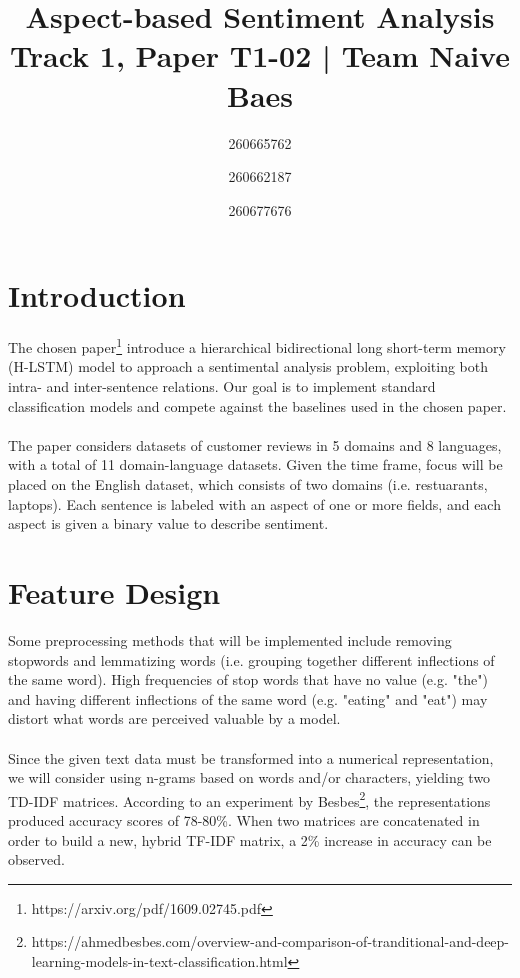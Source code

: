 \documentclass[comsoc,conference]{IEEEtran}
\begin{document}
\title{Aspect-based Sentiment Analysis
	\\ \large{Track 1, Paper T1-02 | Team Naive Baes}
}

\author{
	260665762 \\
	\and
	260662187 \\
	\and
	260677676 \\
}

\maketitle

\section{Introduction} 
\vspace{5px} \noindent 
The chosen paper\footnote{\label{} https://arxiv.org/pdf/1609.02745.pdf} introduce a hierarchical bidirectional long short-term memory (H-LSTM) model to approach a sentimental analysis problem, exploiting both intra- and inter-sentence relations. Our goal is to implement standard classification models and compete against the baselines used in the chosen paper. 
\\
\\ The paper considers datasets of customer reviews in 5 domains and 8 languages, with a total of 11 domain-language datasets. Given the time frame, focus will be placed on the English dataset, which consists of two domains (i.e. restuarants, laptops). Each sentence is labeled with an aspect of one or more fields, and each aspect is given a binary value to describe sentiment.

\section{Feature Design} 
\vspace{5px} \noindent 
Some preprocessing methods that will be implemented include removing stopwords and lemmatizing words (i.e. grouping together different inflections of the same word). High frequencies of stop words that have no value (e.g. "the") and having different inflections of the same word (e.g. "eating" and "eat") may distort what words are perceived valuable by a model.
\\
\\ Since the given text data must be transformed into a numerical representation, we will consider using n-grams based on words and/or characters, yielding two TD-IDF matrices. According to an experiment by Besbes\footnote{\label{} https://ahmedbesbes.com/overview-and-comparison-of-tranditional-and-deep-learning-models-in-text-classification.html}, the representations produced accuracy scores of 78-80\%. When two matrices are concatenated in order to build a new, hybrid TF-IDF matrix, a 2\% increase in accuracy can be observed. 
\end{document}
